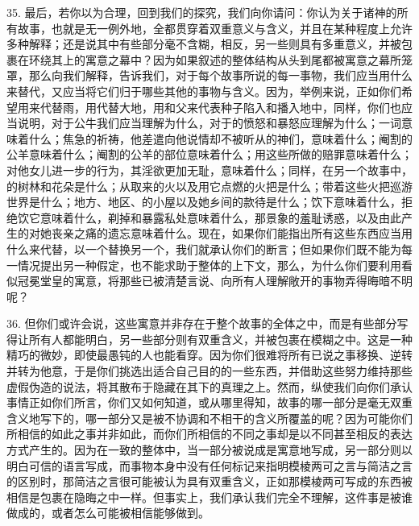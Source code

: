 35. 最后，若你以为合理，回到我们的探究，我们向你请问：你认为关于诸神的所有故事，也就是无一例外地，全都贯穿着双重意义与含义，并且在某种程度上允许多种解释；还是说其中有些部分毫不含糊，相反，另一些则具有多重意义，并被包裹在环绕其上的寓意之幕中？因为如果叙述的整体结构从头到尾都被寓意之幕所笼罩，那么向我们解释，告诉我们，对于每个故事所说的每一事物，我们应当用什么来替代，又应当将它们归于哪些其他的事物与含义。因为，举例来说，正如你们希望用来代替雨，用代替大地，用和父来代表种子陷入和播入地中，同样，你们也应当说明，对于公牛我们应当理解为什么，对于的愤怒和暴怒应理解为什么；一词意味着什么；焦急的祈祷，他差遣向他说情却不被听从的神们，意味着什么；阉割的公羊意味着什么；阉割的公羊的部位意味着什么；用这些所做的赔罪意味着什么；对他女儿进一步的行为，其淫欲更加无耻，意味着什么；同样，在另一个故事中，的树林和花朵是什么；从取来的火以及用它点燃的火把是什么；带着这些火把巡游世界是什么；地方、地区、的小屋以及她乡间的款待是什么；饮下意味着什么，拒绝饮它意味着什么，剃掉和暴露私处意味着什么，那景象的羞耻诱惑，以及由此产生的对她丧亲之痛的遗忘意味着什么。现在，如果你们能指出所有这些东西应当用什么来代替，以一个替换另一个，我们就承认你们的断言；但如果你们既不能为每一情况提出另一种假定，也不能求助于整体的上下文，那么，为什么你们要利用看似冠冕堂皇的寓意，将那些已被清楚言说、向所有人理解敞开的事物弄得晦暗不明呢？\par

36. 但你们或许会说，这些寓意并非存在于整个故事的全体之中，而是有些部分写得让所有人都能明白，另一些部分则有双重含义，并被包裹在模糊之中。这是一种精巧的微妙，即使最愚钝的人也能看穿。因为你们很难将所有已说之事移换、逆转并转为他意，于是你们挑选出适合自己目的的一些东西，并借助这些努力维持那些虚假伪造的说法，将其散布于隐藏在其下的真理之上。然而，纵使我们向你们承认事情正如你们所言，你们又如何知道，或从哪里得知，故事的哪一部分是毫无双重含义地写下的，哪一部分又是被不协调和不相干的含义所覆盖的呢？因为可能你们所相信的如此之事并非如此，而你们所相信的不同之事却是以不同甚至相反的表达方式产生的。因为在一致的整体中，当一部分被说成是寓意地写成，另一部分则以明白可信的语言写成，而事物本身中没有任何标记来指明模棱两可之言与简洁之言的区别时，那简洁之言很可能被认为具有双重含义，正如那模棱两可写成的东西被相信是包裹在隐晦之中一样。但事实上，我们承认我们完全不理解，这件事是被谁做成的，或者怎么可能被相信能够做到。\par

